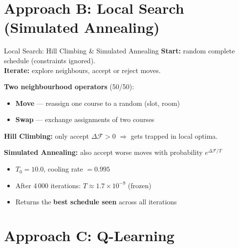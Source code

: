 \documentclass{beamer}
\begin{document}
\section{Approach B: Local Search (Simulated Annealing)}

\begin{frame}{Local Search: Hill Climbing \& Simulated Annealing}
    \textbf{Start:} random complete schedule (constraints ignored).\\
    \textbf{Iterate:} explore neighbours, accept or reject moves.

    \bigskip
    \textbf{Two neighbourhood operators} (50/50):
    \begin{itemize}
        \item \textbf{Move} — reassign one course to a random (slot, room)
        \item \textbf{Swap} — exchange assignments of two courses
    \end{itemize}

    \bigskip
    \textbf{Hill Climbing:} only accept $\Delta\mathcal{F} > 0$ $\Rightarrow$ gets trapped in local optima.

    \bigskip
    \textbf{Simulated Annealing:} also accept worse moves with probability $e^{\Delta\mathcal{F}/T}$
    \begin{itemize}
        \item $T_0 = 10.0$, cooling rate $= 0.995$
        \item After 4\,000 iterations: $T \approx 1.7 \times 10^{-9}$ (frozen)
        \item Returns the \textbf{best schedule seen} across all iterations
    \end{itemize}
\end{frame}

\section{Approach C: Q-Learning}
\end{document}
